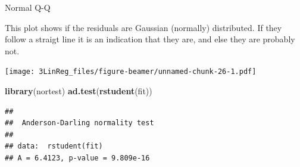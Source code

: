 \documentclass[10pt,ignorenonframetext,]{beamer}
\newenvironment{Shaded}{\begin{snugshade}}{\end{snugshade}}
\newcommand{\KeywordTok}[1]{\textcolor[rgb]{0.13,0.29,0.53}{\textbf{#1}}}
\newcommand{\DataTypeTok}[1]{\textcolor[rgb]{0.13,0.29,0.53}{#1}}
\newcommand{\DecValTok}[1]{\textcolor[rgb]{0.00,0.00,0.81}{#1}}
\newcommand{\StringTok}[1]{\textcolor[rgb]{0.31,0.60,0.02}{#1}}
\newcommand{\OperatorTok}[1]{\textcolor[rgb]{0.81,0.36,0.00}{\textbf{#1}}}
\newcommand{\NormalTok}[1]{#1}
\begin{document}
\begin{frame}[fragile]

\begin{block}{Normal Q-Q}

This plot shows if the residuals are Gaussian (normally) distributed. If
they follow a straigt line it is an indication that they are, and else
they are probably not.

\footnotesize

\begin{Shaded}
\end{Shaded}

\texttt{[image: 3LinReg\_files/figure-beamer/unnamed-chunk-26-1.pdf]}

\begin{Shaded}
\begin{Highlighting}[]
\KeywordTok{library}\NormalTok{(nortest)}
\KeywordTok{ad.test}\NormalTok{(}\KeywordTok{rstudent}\NormalTok{(fit))}
\end{Highlighting}
\end{Shaded}

\begin{verbatim}
## 
##  Anderson-Darling normality test
## 
## data:  rstudent(fit)
## A = 6.4123, p-value = 9.809e-16
\end{verbatim}

\normalsize

\end{block}

\end{frame}
\end{document}
